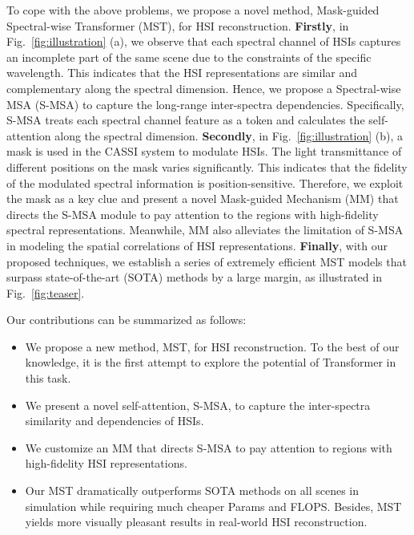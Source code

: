 \documentclass[10pt,twocolumn,letterpaper]{article}
\begin{document}
To cope with the above problems, we propose a novel method, Mask-guided Spectral-wise Transformer (MST), for HSI reconstruction. \textbf{Firstly}, in Fig.~\ref{fig:illustration} (a), we observe that each spectral channel of HSIs captures an incomplete part of the same scene due to the constraints of the specific wavelength. This indicates that the HSI representations are similar and complementary along  the spectral dimension. Hence, we propose a Spectral-wise MSA (S-MSA) to capture the long-range inter-spectra dependencies. Specifically, S-MSA treats each spectral channel feature as a token and calculates the self-attention along the spectral dimension. \textbf{Secondly}, in Fig.~\ref{fig:illustration} (b), a mask is used in the CASSI system to modulate HSIs. The light transmittance of different positions on the mask varies significantly. This indicates that the fidelity of the modulated spectral information is position-sensitive.  Therefore, we exploit the mask as a key clue and  present a novel Mask-guided Mechanism (MM) that directs the S-MSA module to pay attention to the regions with high-fidelity spectral representations. Meanwhile, MM also alleviates the limitation of S-MSA in modeling the spatial correlations of HSI representations. \textbf{Finally}, with our proposed techniques, we establish a series of extremely efficient MST models that surpass state-of-the-art (SOTA) methods by a large margin, as illustrated in Fig.~\ref{fig:teaser}. 

Our contributions can be summarized as follows:
\begin{itemize}
	\vspace{-1.25mm}
	\item We propose a new method, MST, for HSI reconstruction. To the best of our knowledge, it is the first attempt to explore the potential of Transformer in this task. 
	\vspace{-1.25mm}
	\item We present a novel self-attention, S-MSA, to capture the  inter-spectra similarity and dependencies of HSIs.
	\vspace{-1.25mm}
	\item We customize an MM that directs S-MSA to pay attention to regions with high-fidelity HSI representations.
	\vspace{-5.25mm}
	\item Our MST dramatically outperforms SOTA methods on all scenes in simulation while requiring much cheaper Params and FLOPS. Besides, MST yields more visually pleasant results in real-world HSI reconstruction. 
\end{itemize}
\end{document}

